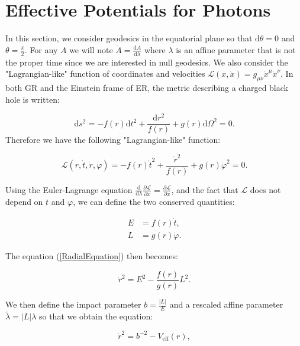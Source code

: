 \documentclass[floats,floatfix,aps, preprintnumbers,nofootinbib]{revtex4-2}
\newcommand{\mrm}{\mathrm}
\newcommand{\mscr}{\mathscr}
\begin{document}



\appendix
\onecolumngrid

\section{Effective Potentials for Photons}\label{appendix:effpot}

In this section, we consider geodesics in the equatorial plane so that $\mrm d\theta = 0$ and $\theta=\frac\pi 2$. For any $A$ we will note $\dot A = \frac{\mrm dA}{\mrm d\lambda}$ where $\lambda$ is an affine parameter that is not the proper time since we are interested in null geodesics. We also consider the "Lagrangian-like" function of coordinates and velocities $\mscr L(x,\dot x) = g_{\mu\nu}\dot x^\mu\dot x^\nu$. In both GR and the Einstein frame of ER, the metric describing a charged black hole is written:

\begin{equation}\label{MetricForm}
    \mrm ds^2 = -f(r)\mrm dt^2 + \frac{\mrm dr^2}{f(r)} + g(r)\mrm d\Omega^2 = 0.
\end{equation}
Therefore we have the following "Lagrangian-like" function:

\begin{equation}\label{RadialEquation}
    \mscr L(r,\dot t, \dot r, \dot \varphi) = -f(r)\dot t^2 + \frac{\dot r^2}{f(r)} + g(r)\dot \varphi^2 = 0.
\end{equation}

Using the Euler-Lagrange equation $\frac{\mrm d}{\mrm d\lambda}\frac{\partial\mscr L}{\partial \dot x} = \frac{\partial \mscr L}{\partial x}$, and the fact that $\mscr L$ does not depend on $t$ and $\varphi$, we can define the two conserved quantities:

\begin{align}
    E &= f(r)\dot t, \\
    L &= g(r)\dot \varphi.
\end{align}

The equation (\ref{RadialEquation}) then becomes:

\begin{equation}
    \dot r^2 = E^2 - \frac{f(r)}{g(r)}L^2.
\end{equation}

We then define the impact parameter $b = \frac{|L|}{E}$ and a rescaled affine parameter $\tilde\lambda = |L| \lambda$ so that we obtain the equation:

\begin{equation}
    \dot r^2 = b^{-2} - V_\mrm{eff}(r),
\end{equation}
\end{document}
